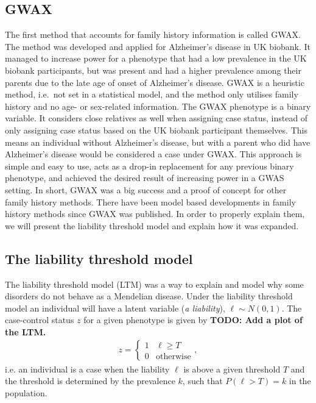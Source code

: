 \subsection{GWAX}
The first method that accounts for family history information is called GWAX. The method was developed and applied for Alzheimer's disease in UK biobank\cite{gwax}. It managed to increase power for a phenotype that had a low prevalence in the UK biobank participants, but was present and had a higher prevalence among their parents due to the late age of onset of Alzheimer's disease. GWAX is a heuristic method, i.e.\ not set in a statistical model, and the method only utilises family history and no age- or sex-related information. The GWAX phenotype is a binary variable. It considers close relatives as well when assigning case status, instead of only assigning case status based on the UK biobank participant themselves. This means an individual without Alzheimer's disease, but with a parent who did have Alzheimer's disease would be considered a case under GWAX. This approach is simple and easy to use, acts as a drop-in replacement for any previous binary phenotype, and achieved the desired result of increasing power in a GWAS setting. In short, GWAX was a big success and a proof of concept for other family history methods. There have been model based developments in family history methods since GWAX was published. In order to properly explain them, we will present the liability threshold model and explain how it was expanded.


\subsection{The liability threshold model}
The liability threshold model (LTM) was a way to explain and model why some disorders do not behave as a Mendelian disease. Under the liability threshold model an individual will have a latent variable (\textit{a liability}), $ \ell \sim N(0,1)$. The case-control status $ z $ for a given phenotype is given by 
\textbf{TODO: Add a plot of the LTM.}
\begin{align*}
z = 
\begin{cases}
1 & \ell \geq T \\
0 & \text{otherwise}
\end{cases},
\end{align*}
i.e. an individual is a case when the liability $ \ell $ is above a given threshold $ T $ and the threshold is determined by the prevalence $ k $, such that $ P(\ell > T) = k $ in the population. 

